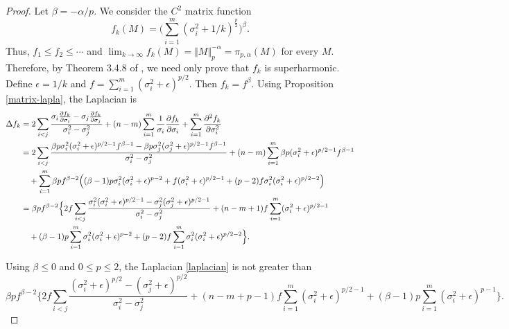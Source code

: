 \documentclass[11pt, a4paper]{article}
\theoremstyle{remark}
\begin{document}
\begin{proof}
Let $\beta=-\alpha/p$. We consider the $C^2$ matrix function $$f_{k}(M)=\Big(\sum_{i=1}^m(\sigma_i^2+1/k)^{\frac{p}{2}} \Big)^{\beta}.$$
Thus, $f_{1}\le f_{2}\le\cdots$ and $\lim_{k\to\infty}f_k(M)=\Vert M\Vert_{p}^{-\alpha}=\pi_{p,\alpha}(M)$ for every $M$. Therefore, by Theorem 3.4.8 of \cite{helms2009potential}, we need only prove that $f_k$ is superharmonic. Define $\epsilon=1/k$ and $f=\sum_{i=1}^m(\sigma_i^2+\epsilon)^{p/2}$. Then $f_k=f^\beta$.
Using Proposition \ref{matrix-lapla}, the Laplacian is
\begin{align}
  \Delta f_k  &=2\sum_{i<j}\frac{\sigma_i\frac{\partial f_k}{\partial \sigma_i}-\sigma_j\frac{\partial f_k}{\partial \sigma_j}}{\sigma_i^2-\sigma_j^2}+(n-m)\sum_{i=1}^m\frac{1}{\sigma_i}\frac{\partial f_k}{\partial \sigma_i}+\sum_{i=1}^m\frac{\partial^2 f_k}{\partial \sigma_i^2} \notag\\
  &=2\sum_{i<j}\frac{\beta p\sigma_i^2(\sigma_i^2+\epsilon)^{p/2-1} f^{\beta-1}-\beta p\sigma_j^2(\sigma_j^2+\epsilon)^{p/2-1} f^{\beta-1}}{\sigma_i^2-\sigma_j^2}+(n-m)\sum_{i=1}^m\beta p(\sigma_i^2+\epsilon)^{p/2-1} f^{\beta-1}\notag\\
  &\quad+\sum_{i=1}^m\beta pf^{\beta-2}\Big((\beta-1)p\sigma_i^2(\sigma_i^2+\epsilon)^{p-2} +f(\sigma_i^2+\epsilon)^{p/2-1}+(p-2)f\sigma_i^2(\sigma_i^2+\epsilon)^{p/2-2}\Big) \notag\\
  &=\beta pf^{\beta-2}\Big\{2f\sum_{i<j}\frac{\sigma_i^2(\sigma_i^2+\epsilon)^{p/2-1}-\sigma_j^2(\sigma_j^2+\epsilon)^{p/2-1}}{\sigma_i^2-\sigma_j^2}+(n-m+1)f\sum_{i=1}^m(\sigma_i^2+\epsilon)^{p/2-1} \notag\\
  &\quad+(\beta-1)p\sum_{i=1}^m \sigma_i^2(\sigma_i^2+\epsilon)^{p-2}+(p-2)f\sum_{i=1}^m\sigma_i^2(\sigma_i^2+\epsilon)^{p/2-2} \Big\}. \label{laplacian}
\end{align}

Using $\beta\le0$ and $0\le p \le 2$, the Laplacian \eqref{laplacian} is not greater than
\begin{equation}
\beta pf^{\beta-2}\Big\{2f\sum_{i<j}\frac{(\sigma_i^2+\epsilon)^{p/2}-(\sigma_j^2+\epsilon)^{p/2}}{\sigma_i^2-\sigma_j^2}+(n-m+p-1)f\sum_{i=1}^m(\sigma_i^2+\epsilon)^{p/2-1}+(\beta-1)p\sum_{i=1}^m(\sigma_i^2+\epsilon)^{p-1} \Big\}. \label{ineq-0}
\end{equation}


\end{proof}
\end{document}
